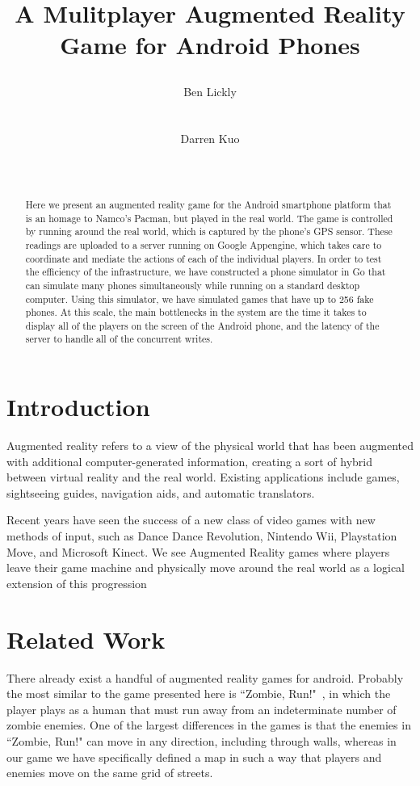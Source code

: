 \documentclass{acm_proc_article-sp}
\title{A Mulitplayer Augmented Reality Game for Android Phones
\numberofauthors{2}
\author{
\alignauthor Ben Lickly \\
       \affaddr{University of California, Berkeley}\\
       \affaddr{Berkeley, CA, USA} \\
       \email{blickly@eecs.berkeley.edu}
\alignauthor Darren Kuo \\
       \affaddr{University of California, Berkeley}\\
       \affaddr{Berkeley, CA, USA} \\
       \email{darrenkuo@eecs.berkeley.edu}
}
}
\begin{document}
\maketitle

\begin{abstract}
Here we present an augmented reality game for the Android smartphone platform
that is an homage to Namco's Pacman, but played in the real world.  The game is
controlled by running around the real world, which is captured by the phone's
GPS sensor. These readings are uploaded to a server running on Google
Appengine, which takes care to coordinate and mediate the actions of each of
the individual players.  In order to test the efficiency of the infrastructure,
we have constructed a phone simulator in Go that can simulate many phones
simultaneously while running on a standard desktop computer. Using this
simulator, we have simulated games that have up to 256 fake phones. At this
scale, the main bottlenecks in the system are the time it takes to display all
of the players on the screen of the Android phone, and the latency of the
server to handle all of the concurrent writes.
\end{abstract}

\section{Introduction}
Augmented reality refers to a view of the physical world that has been
augmented with additional computer-generated information, creating a
sort of hybrid between virtual reality and the real world. Existing
applications include games, sightseeing guides, navigation aids, and
automatic translators.

Recent years have seen the success of a new class of video games with
new methods of input, such as Dance Dance Revolution, Nintendo Wii,
Playstation Move, and Microsoft Kinect. We see Augmented Reality games
where players leave their game machine and physically move around the
real world as a logical extension of this progression

\section{Related Work}
There already exist a handful of augmented reality games for android. Probably
the most similar to the game presented here is ``Zombie, Run!"~\cite{ZombieRun},
in which the player plays as a human that must run away from an indeterminate number of zombie enemies. One of the largest differences in the games is
that the enemies in ``Zombie, Run!" can move in any direction, including
through walls, whereas in our game we have specifically defined a map in
such a way that players and enemies move on the same grid of streets.
\end{document}
